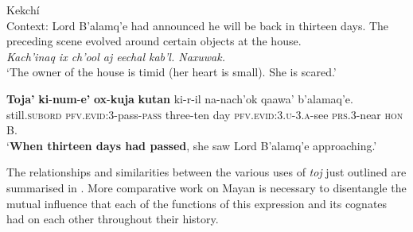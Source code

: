 \begin{exe}
	\ex Kekchí\label{exRemotenessKekchiScared}\\
	Context: Lord B\rq{}alamq\rq{}e had announced he will be back in thirteen days. The preceding scene evolved around certain objects at the house.\\
	\textit{Kach’inaq ix ch’ool aj eechal kab’l. Naxuwak.}\\
	\lq The owner of the house is timid (her heart is small). She is scared.\rq{}
	
	\exi{}
	\gll \textbf{Toja\rq} \textbf{ki}-\textbf{num}-\textbf{e\rq} \textbf{ox}-\textbf{kuja} \textbf{kutan} ki-r-il na-nach\rq{}ok qaawa\rq{} b\rq{}alamaq\rq{}e.\\
	still.\textsc{subord} \textsc{pfv}.\textsc{evid}:3-pass-\textsc{pass} three-ten day \textsc{pfv}.\textsc{evid}:3.\textsc{u}-3.\textsc{a}-see \textsc{prs}.3-near \textsc{hon} B.\\
	\glt \lq \textbf{When thirteen days had passed}, she saw Lord B\rq{}alamq\rq{}e approaching.\rq{ }\parencite[230]{Kockelman2010}
\end{exe}

The relationships and similarities between the various uses of \textit{toj} just outlined are summarised in . More comparative work on Mayan is necessary to disentangle the mutual influence that each of the functions of this expression and its cognates had on each other throughout their history.

